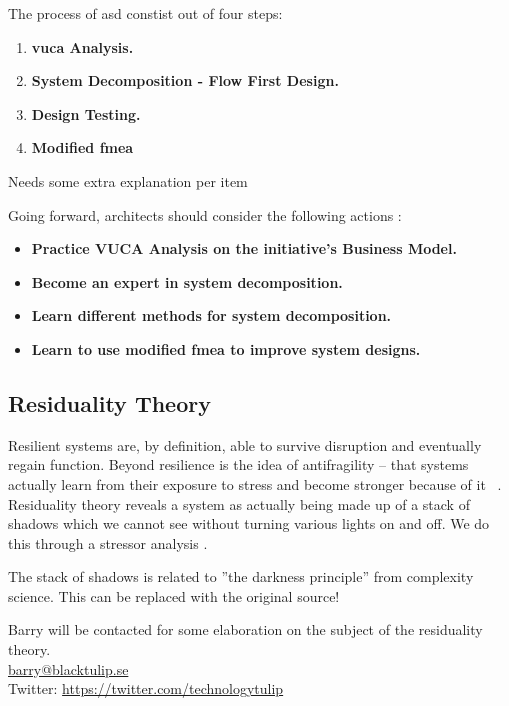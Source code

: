The process of \acrshort{asd} constist out of four steps:
\begin{enumerate}
	\item{\textbf{\acrshort{vuca} Analysis.}}
	\item{\textbf{System Decomposition - Flow First Design.}}
	\item{\textbf{Design Testing.}}
	\item{\textbf{Modified \acrfull{fmea}}}
\end{enumerate}
\begin{remark}
	Needs some extra explanation per item
\end{remark}

Going forward, architects should consider the following actions \parencite[p. 889]{OReilly2019}:
\begin{itemize}
	\item{\textbf{Practice VUCA Analysis on the initiative's Business Model.}}
	\item{\textbf{Become an expert in system decomposition.}}
	\item{\textbf{Learn different methods for system decomposition.}}
	\item{\textbf{Learn to use modified \acrshort{fmea} to improve system designs.}}
\end{itemize}

\subsection{Residuality Theory}
\label{sub:residualitytheory}

Resilient systems are, by definition, able to survive disruption and eventually regain function. Beyond resilience is the
idea of antifragility – that systems actually learn from their exposure to stress and become stronger because of it \parencite{Taleb2012}\ \parencite[p. 876]{OReilly2020}. Residuality theory reveals a system as actually being made up of a stack of shadows which we cannot see without turning various lights on and off. We do this through a stressor analysis \parencite[p. 877]{OReilly2020}.

\begin{remark}
	The stack of shadows is related to ''the darkness principle'' \parencite[p. 78]{Richardson2004} from complexity science. This can be replaced with the original source!
\end{remark}

\begin{remark}
	Barry will be contacted for some elaboration on the subject of the residuality theory.\\
	\href{mailto:barry@blacktulip.se}{barry@blacktulip.se}\\
	Twitter: \href{https://twitter.com/technologytulip}{https://twitter.com/technologytulip}
\end{remark}

